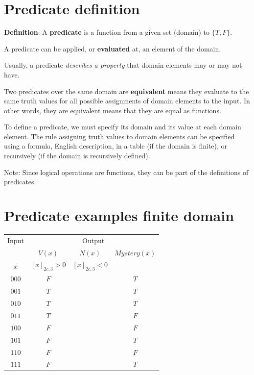 \documentclass[12pt, oneside]{article}
\begin{document}
\begin{flushright}
\end{flushright} \section*{Predicate definition}


{\bf  Definition}: A  {\bf predicate}  is  a function from a given set (domain) to $\{T,F\}$.

A predicate can be applied, or {\bf evaluated} at, an element of the domain.

Usually, a predicate {\it describes a  property} that domain elements may or may not have.

Two predicates over the same domain are {\bf equivalent} means they evaluate to
the same truth values for all possible assignments of domain elements to the
input. In other words, they are equivalent means that they are equal as functions.

To define a predicate, we must specify its domain and its value at each domain element.
The rule assigning truth values to domain elements can be specified using a formula, 
English description, in a table (if the domain is finite), or recursively (if the domain is recursively
defined).

Note: Since logical operations are functions, they can be part of the definitions of predicates. \vfill
\section*{Predicate examples finite domain}


\begin{center}
    \begin{tabular}{c||c|c|c}
    Input & \multicolumn{3}{c}{Output} \\
    &$V(x)$ & $N(x)$ & $Mystery(x)$\\
    $x$ & $[x]_{2c,3} > 0$ & $[x]_{2c,3} < 0$& \\
    \hline
    $000$  & $F$ & & $T$\\
    $001$  & $T$ & & $T$\\
    $010$  & $T$ & & $T$\\
    $011$  & $T$ & & $F$\\
    $100$  & $F$ & & $F$\\
    $101$  & $F$ & & $T$\\
    $110$  & $F$ & & $F$\\
    $111$  & $F$ & & $T$\\
    \end{tabular}
    \end{center}
    
\end{document}
